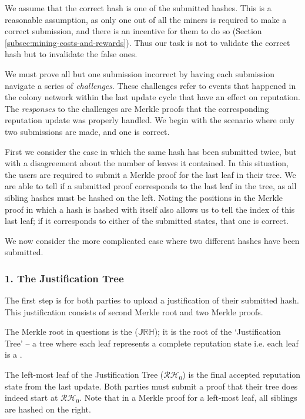 We assume that the correct hash is one of the  submitted hashes. This is a reasonable assumption, as only one out of all the miners is required to make a correct submission, and there is an incentive for them to do so (Section \ref{subsec:mining-costs-and-rewards}). Thus our task is not to validate the correct hash but to invalidate the false ones.

We must prove all but one submission incorrect by having each submission navigate a series of \emph{challenges}. These challenges refer to events that happened in the colony network within the last update cycle that have an effect on reputation. The \emph{responses} to the challenges are Merkle proofs that the corresponding reputation update was properly handled. We begin with the scenario where only two submissions are made, and one is correct. 

First we consider the case in which the same hash has been submitted twice, but with a disagreement about the number of leaves it contained. In this situation, the users are required to submit a Merkle proof for the last leaf in their tree. We are able to tell if a submitted proof corresponds to the last leaf in the tree, as all sibling hashes must be hashed on the left. Noting the positions in the Merkle proof in which a hash is hashed with itself also allows us to tell the index of this last leaf; if it corresponds to either of the submitted states, that one is correct.

We now consider the more complicated case where two different hashes have been submitted.

\subsubsection*{1. The Justification Tree}
  \newcommand{\jrh}{\ensuremath{\mathbb{JRH}}}
The first step is for both parties to upload a justification of their submitted hash. This justification consists of second Merkle root and two Merkle proofs.

The Merkle root in questions is the  (\jrh); it is the root of the `Justification Tree' -- a tree where each leaf represents a complete reputation state i.e. each leaf is a . 

The left-most leaf of the Justification Tree ($\mathcal{RH}_0$) is the final accepted reputation state from the last update. Both parties must submit a proof that their tree does indeed start at $\mathcal{RH}_0$. Note that in a Merkle proof for a left-most leaf, all siblings are hashed on the right.

